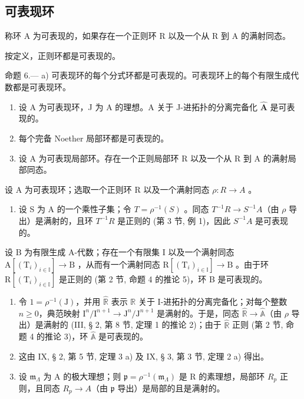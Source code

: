 \subsection{可表现环}

称环 A 为可表现的，如果存在一个正则环 R 以及一个从 R 到 A 的满射同态。

按定义，正则环都是可表现的。

命题 6.--- a) 可表现环的每个分式环都是可表现的。可表现环上的每个有限生成代数都是可表现环。

\begin{enumerate}
\def\labelenumi{\alph{enumi})}
\setcounter{enumi}{1}
\item
  设 A 为可表现环，J 为 A 的理想。A 关于 J-进拓扑的分离完备化 \(\widehat{\mathbf{A}}\) 是可表现的。
\item
  每个完备 Noether 局部环都是可表现的。
\item
  设 A 为可表现局部环。存在一个正则局部环 R 以及一个从 R 到 A 的满射局部同态。
\end{enumerate}

设 A 为可表现环；选取一个正则环 R 以及一个满射同态 \(\rho: R \to A\) 。

\begin{enumerate}
\def\labelenumi{\alph{enumi})}
\tightlist
\item
  设 S 为 A 的一个乘性子集；令 \(T = \rho^{-1}(S)\) 。同态 \(T^{-1}R \to S^{-1}A\)（由 \(\rho\) 导出）是满射的，且环 \(T^{-1}R\) 是正则的 (第 3 节, 例 1)，因此 \(S^{-1}A\) 是可表现的。
\end{enumerate}

设 B 为有限生成 A-代数；存在一个有限集 I 以及一个满射同态 \(\mathrm{A}[(\mathrm{T}_{i})_{i\in\mathbb{I}}]\to\mathrm{B}\) ，从而有一个满射同态 \(\mathrm{R}[(\mathrm{T}_{i})_{i\in\mathbb{I}}]\to\mathrm{B}\) 。由于环 \(\mathrm{R}[(\mathrm{T}_{i})_{i\in\mathbb{I}}]\) 是正则的 (第 2 节, 命题 4 的推论 5)，环 B 是可表现的。

\begin{enumerate}
\def\labelenumi{\alph{enumi})}
\setcounter{enumi}{1}
\item
  令 \(1 = \rho^{-1}(\mathrm{J})\)，并用 \(\widehat{\mathbb{R}}\) 表示 \(\mathbb{R}\) 关于 I-进拓扑的分离完备化；对每个整数 \(n \geqslant 0\)，典范映射 \(\mathrm{I}^n / \mathrm{I}^{n+1} \to \mathrm{J}^n / \mathrm{J}^{n+1}\) 是满射的。于是，同态 \(\widehat{\mathbb{R}} \to \widehat{\mathbb{A}}\)（由 \(\rho\) 导出）是满射的 (III, § 2, 第 8 节, 定理 1 的推论 2)；由于 \(\widehat{\mathbb{R}}\) 正则 (第 2 节, 命题 4 的推论 3)，环 \(\widehat{\mathbb{A}}\) 是可表现的。
\item
  这由 IX, § 2, 第 5 节, 定理 3 a) 及 IX, § 3, 第 3 节, 定理 2 a) 得出。
\item
  设 \(\mathfrak{m}_{\Lambda}\) 为 A 的极大理想；则 \(\mathfrak{p} = \mathfrak{\rho}^{-1}(\mathfrak{m}_{\Lambda})\) 是 R 的素理想，局部环 \(R_{p}\) 正则，且同态 \(R_{p} \to A\)（由 \(\mathfrak{p}\) 导出）是局部的且是满射的。
\end{enumerate}

